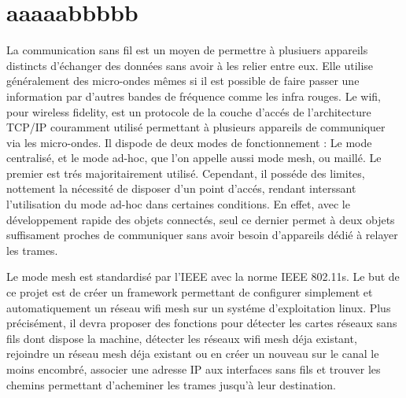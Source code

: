 \chapter*{aaaaabbbbb}

La communication sans fil est un moyen de permettre à plusiuers appareils distincts d'échanger des données sans avoir à les relier
entre eux. Elle utilise généralement des micro-ondes mêmes si il est possible de faire passer une information par d'autres bandes de
fréquence comme les infra rouges. Le wifi, pour wireless fidelity, est un protocole de la couche d'accés de l'architecture TCP/IP
couramment utilisé permettant à plusieurs appareils de communiquer via les micro-ondes. Il dispode de deux modes de fonctionnement : 
Le mode centralisé, et le mode ad-hoc, que l'on appelle aussi mode mesh, ou maillé. Le premier est trés majoritairement utilisé. 
Cependant, il posséde des limites, nottement la nécessité de disposer d'un point d'accés, rendant interssant l'utilisation du mode
ad-hoc dans certaines conditions. En effet, avec le développement rapide des objets connectés, seul ce dernier permet à deux objets
suffisament proches de communiquer sans avoir besoin d'appareils dédié à relayer les trames.

Le mode mesh est standardisé par l'IEEE avec la norme IEEE 802.11s. Le but de ce projet est de créer un framework permettant de
configurer simplement et automatiquement un réseau wifi mesh sur un systéme d'exploitation linux. Plus précisément, il devra proposer
des fonctions pour détecter les cartes réseaux sans fils dont dispose la machine, détecter les réseaux wifi mesh déja existant,
rejoindre un réseau mesh déja existant ou en créer un nouveau sur le canal le moins encombré, associer une adresse IP aux interfaces
sans fils et trouver les chemins permettant d'acheminer les trames jusqu'à leur destination.



